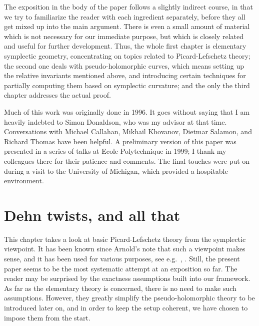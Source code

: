 \documentclass[10pt,letterpaper]{article}
\begin{document}
The exposition in the body of the paper follows a slightly indirect course, in
that we try to familiarize the reader with each ingredient separately, before
they all get mixed up into the main argument. There is even a small amount of
material which is not necessary for our immediate purpose, but which is closely
related and useful for further development. Thus, the whole first chapter is
elementary symplectic geometry, concentrating on topics related to
Picard-Lefschetz theory; the second one deals with pseudo-holomorphic curves,
which means setting up the relative invariants mentioned above, and introducing
certain techniques for partially computing them based on symplectic curvature;
and the only the third chapter addresses the actual proof.

\begin{acknow}
Much of this work was originally done in 1996. It goes without saying that I am
heavily indebted to Simon Donaldson, who was my advisor at that time.
Conversations with Michael Callahan, Mikhail Khovanov, Dietmar Salamon, and
Richard Thomas have been helpful. A preliminary version of this paper was
presented in a series of talks at Ecole Polytechnique in 1999; I thank my
colleagues there for their patience and comments. The final touches were put on
during a visit to the University of Michigan, which provided a hospitable
environment.
\end{acknow}

\newpage
{}

%

\section[Dehn twists]{Dehn twists, and all that\label{ch:one}}

This chapter takes a look at basic Picard-Lefschetz theory from the symplectic
viewpoint. It has been known since Arnold's note \cite{arnold95} that such a
viewpoint makes sense, and it has been used for various purposes, see e.g.\
\cite{seidel98b}, \cite{khovanov-seidel98}. Still, the present paper seems to
be the most systematic attempt at an exposition so far. The reader may be
surprised by the exactness assumptions built into our framework. As far as the
elementary theory is concerned, there is no need to make such assumptions.
However, they greatly simplify the pseudo-holomorphic theory to be introduced
later on, and in order to keep the setup coherent, we have chosen to impose
them from the start.
\end{document}
